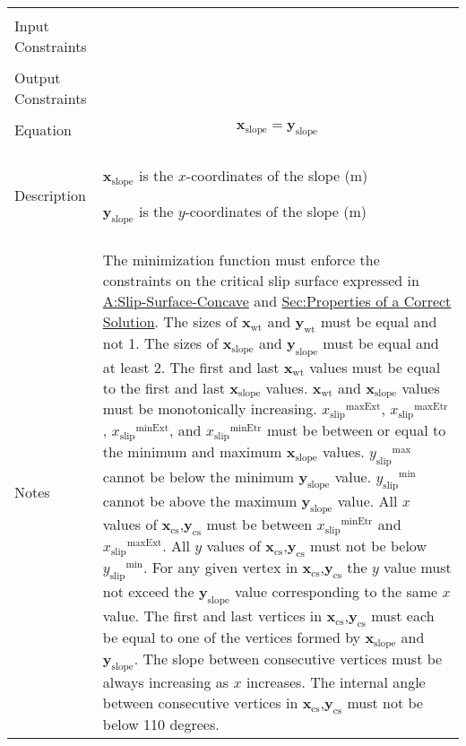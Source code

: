 \documentclass[12pt]{article}
\begin{document}
\begin{minipage}{\textwidth}
\begin{tabular}{>{\raggedright}p{}>{\raggedright\arraybackslash}p{}}
\\ \midrule \\
Input Constraints & 
\\ \midrule \\
Output Constraints & 
\\ \midrule \\
Equation & \begin{displaymath}
           {\symbf{x}_{\text{slope}}}={\symbf{y}_{\text{slope}}}
           \end{displaymath}
\\ \midrule \\
Description & \begin{symbDescription}
              \item{${\symbf{x}_{\text{slope}}}$ is the $x$-coordinates of the slope (${\text{m}}$)}
              \item{${\symbf{y}_{\text{slope}}}$ is the $y$-coordinates of the slope (${\text{m}}$)}
              \end{symbDescription}
\\ \midrule \\
Notes & The minimization function must enforce the constraints on the critical slip surface expressed in \hyperref[assumpSSC]{A:Slip-Surface-Concave} and \hyperref[Sec:CorSolProps]{Sec:Properties of a Correct Solution}. The sizes of ${\symbf{x}_{\text{wt}}}$ and ${\symbf{y}_{\text{wt}}}$ must be equal and not 1. The sizes of ${\symbf{x}_{\text{slope}}}$ and ${\symbf{y}_{\text{slope}}}$ must be equal and at least 2. The first and last ${\symbf{x}_{\text{wt}}}$ values must be equal to the first and last ${\symbf{x}_{\text{slope}}}$ values. ${\symbf{x}_{\text{wt}}}$ and ${\symbf{x}_{\text{slope}}}$ values must be monotonically increasing. ${{x_{\text{slip}}}^{\text{maxExt}}}$, ${{x_{\text{slip}}}^{\text{maxEtr}}}$, ${{x_{\text{slip}}}^{\text{minExt}}}$, and ${{x_{\text{slip}}}^{\text{minEtr}}}$ must be between or equal to the minimum and maximum ${\symbf{x}_{\text{slope}}}$ values. ${{y_{\text{slip}}}^{\text{max}}}$ cannot be below the minimum ${\symbf{y}_{\text{slope}}}$ value. ${{y_{\text{slip}}}^{\text{min}}}$ cannot be above the maximum ${\symbf{y}_{\text{slope}}}$ value. All $x$ values of ${\symbf{x}_{\text{cs}}}\text{,}{\symbf{y}_{\text{cs}}}$ must be between ${{x_{\text{slip}}}^{\text{minEtr}}}$ and ${{x_{\text{slip}}}^{\text{maxExt}}}$. All $y$ values of ${\symbf{x}_{\text{cs}}}\text{,}{\symbf{y}_{\text{cs}}}$ must not be below ${{y_{\text{slip}}}^{\text{min}}}$. For any given vertex in ${\symbf{x}_{\text{cs}}}\text{,}{\symbf{y}_{\text{cs}}}$ the $y$ value must not exceed the ${\symbf{y}_{\text{slope}}}$ value corresponding to the same $x$ value. The first and last vertices in ${\symbf{x}_{\text{cs}}}\text{,}{\symbf{y}_{\text{cs}}}$ must each be equal to one of the vertices formed by ${\symbf{x}_{\text{slope}}}$ and ${\symbf{y}_{\text{slope}}}$. The slope between consecutive vertices must be always increasing as $x$ increases. The internal angle between consecutive vertices in ${\symbf{x}_{\text{cs}}}\text{,}{\symbf{y}_{\text{cs}}}$ must not be below 110 degrees.
        

\end{tabular}
\end{minipage}
\end{document}
